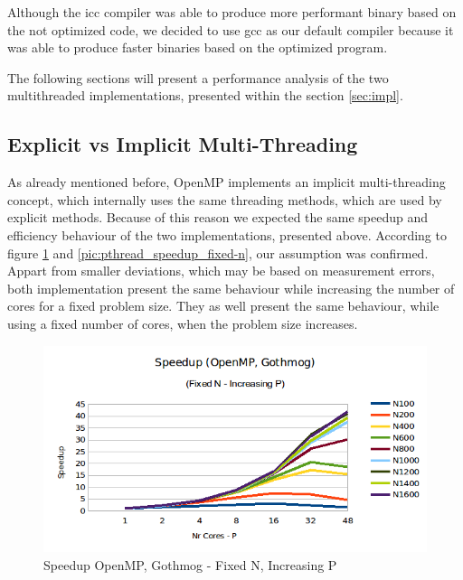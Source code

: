 \documentclass[conference]{IEEEtran}
\begin{document}
Although the icc compiler was able to produce more performant binary based on the not optimized code, we decided to use gcc as our default compiler because it was able to produce faster binaries based on the optimized program. 

The following sections will present a performance analysis of the two multithreaded implementations, presented within the section \ref{sec:impl}. 

\subsection{Explicit vs Implicit Multi-Threading}
\label{sec:analysis:pthread}

As already mentioned before, OpenMP implements an implicit multi-threading concept, which internally uses the same threading methods, which are used by explicit methods. Because of this reason we expected the same speedup and efficiency behaviour of the two implementations, presented above. According to figure \ref{pic:omp_speedup_fixed-n} and \ref{pic:pthread_speedup_fixed-n}, our assumption was confirmed. Appart from smaller deviations, which may be based on measurement errors, both implementation present the same behaviour while increasing the number of cores for a fixed problem size. They as well present the same behaviour, while using a fixed number of cores, when the problem size increases. 

\begin{figure}[h]
  \centering
  \includegraphics[scale=0.42]{pic/omp_gothmog_speedup-fixed-n.png} 
  \caption{Speedup OpenMP, Gothmog - Fixed N, Increasing P}
  \label{pic:omp_speedup_fixed-n}
\end{figure}
\end{document}
